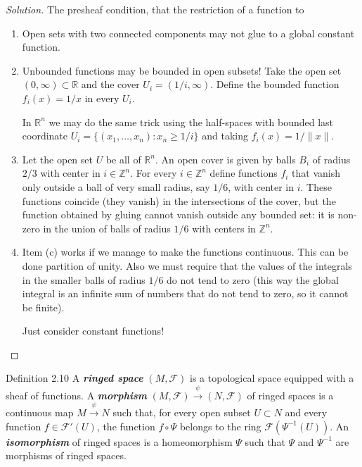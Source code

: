 \begin{proof}[Solution]\leavevmode
The presheaf condition, that the restriction of a function to 
	\begin{enumerate}[label=(\alph*)]
\item Open sets with two connected components may not glue to a global constant function.

\item Unbounded functions may be bounded in open subsets! Take the open set $(0,\infty)\subset \mathbb{R}$ and the cover $U_i=(1/i,\infty)$. Define the bounded function $f_i(x)=1/x$ in every $U_i$.

	In $\mathbb{R}^n$ we may do the same trick using the half-spaces with bounded last coordinate $U_i=\{(x_1,\ldots,x_n):x_n \geq 1/i\}$ and taking  $f_i(x)=1/\|x\|$.

\item Let the open set $U$ be all of $\mathbb{R}^n$. An open cover is given by balls $B_i$ of radius $2/3$ with center in  $i \in\mathbb{Z}^n$.  For every $i \in \mathbb{Z}^n$ define functions $f_i$ that vanish only outside a ball of very small radius, say $1/6$, with center in $i$. These functions coincide (they vanish) in the intersections of the cover, but the function obtained by gluing cannot vanish outside any bounded set: it is non-zero in the union of balls of radius $1/6$ with centers in  $\mathbb{Z}^n$.

\item Item (c) works if we manage to make the functions continuous. This can be done partition of unity. Also we must require that the values of the integrals in the smaller balls of radius $1/6$ do not tend to zero (this way the global integral is an infinite sum of numbers that do not tend to zero, so it cannot be finite).

	{\color{9}Just consider constant functions!}
\end{enumerate}
\end{proof}

\begin{thing3}{Definition 2.10}\leavevmode
	A \textit{\textbf{ringed space}} $(M,\mathcal{F})$ is a topological space equipped with a sheaf of functions. A \textit{\textbf{morphism}} $(M,\mathcal{F}) \xrightarrow{\psi}(N,\mathcal{F})$ of ringed spaces is a continuous map $M \xrightarrow{\psi}N$ such that, for every open subset $U \subset N$ and every function $f \in \mathcal{F}'(U)$, the function $f \circ \Psi$ belongs to the ring $\mathcal{F}(\Psi^{-1}(U))$. An \textit{\textbf{isomorphism}} of ringed spaces is a homeomorphism $\Psi$ such that $\Psi$ and $\Psi^{-1}$ are morphisms of ringed spaces.
\end{thing3}

